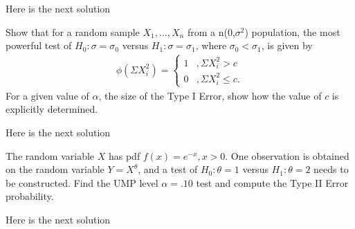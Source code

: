 \documentclass[12pt,letterpaper]{exam}
\begin{document}
\begin{questions}
	\begin{solution}
		Here is the next solution
	\end{solution}
	
	
	\setcounter{question}{15-1}
	
	\question 
	Show that for a random sample $X_1, ..., X_n$ from a n(0,$\sigma^2$) population, 
	the most powerful test of $H_0: \sigma = \sigma_0$ versus $H_1: \sigma = \sigma_1$, 
	where $\sigma_0 < \sigma_1$, is given by
	\begin{align*}
		\phi\left(\Sigma X_i^2\right) =
		\begin{cases}
			1 &, \Sigma X_i^2 > c \\
			0 &, \Sigma X_i^2 \le c.
		\end{cases}
	\end{align*}
	For a given value of $\alpha$, the size of the Type I Error, show how the value of $c$ is explicitly determined.
	
	\begin{solution}
		Here is the next solution
	\end{solution}
	
	\setcounter{question}{19-1}
	
	\question 
	The random variable $X$ has pdf $f(x) = e^{-x}, x> 0$. 
	One observation is obtained on the random variable $Y = X^\theta$, 
	and a test of $H_0: \theta = 1$ versus $H_1: \theta = 2$ needs to be constructed. 
	Find the UMP level $\alpha = .10$ test and compute the Type II Error probability.

	\begin{solution}
		Here is the next solution
	\end{solution}
	

\end{questions}
\end{document}
